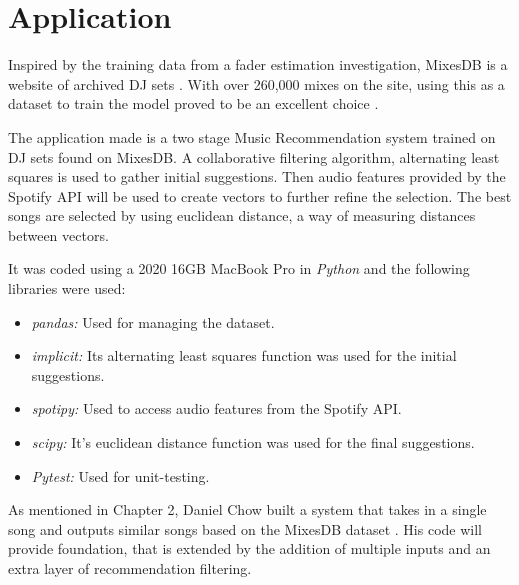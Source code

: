 
\graphicspath{{Chapter5/}}



\chapter{Application}

Inspired by the training data from a fader estimation investigation, MixesDB is a website of archived DJ sets \citep{kim_automatic_2017}. With over 260,000 mixes on the site, using this as a dataset to train the model proved to be an excellent choice \citep{mixesdb_main_2023}.
 
 The application made is a two stage Music Recommendation system trained on DJ sets found on MixesDB. A collaborative filtering algorithm, alternating least squares is used to gather initial suggestions. Then audio features provided by the Spotify API will be used to create vectors to further refine the selection. The best songs are selected by using euclidean distance, a way of measuring distances between vectors. 
 
 It was coded using a 2020 16GB MacBook Pro in \textit{Python} and the following libraries were used:
 \begin{itemize}
 	\item \textit{pandas:} Used for managing the dataset.
 	\item \textit{implicit:} Its alternating least squares function was used for the initial suggestions.
 	\item \textit{spotipy:} Used to access audio features from the Spotify API.
 	\item \textit{scipy:} It's euclidean distance function was used for the final suggestions.
 	\item \textit{Pytest:} Used for unit-testing.
	\end{itemize}
 
 As mentioned in Chapter 2, Daniel Chow built a system that takes in a single song and outputs similar songs based on the MixesDB dataset \citep{chow_music_2020}. His code will provide foundation, that is extended by the addition of multiple inputs and an extra layer of recommendation filtering.


